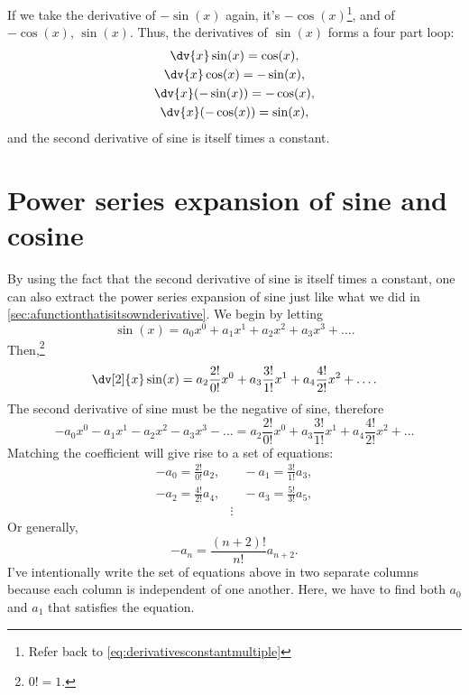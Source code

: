 If we take the derivative of $-\sin(x)$ again, it's $-\cos(x)$\footnote{Refer back to \cref{eq:derivativesconstantmultiple}}, and of $-\cos(x)$, $\sin(x)$. Thus, the derivatives of $\sin(x)$ forms a four part loop:
\begin{gather*}
    \dv{x}\sin(x) = \cos(x), \\
    \dv{x}\cos(x) = -\sin(x), \\
    \dv{x}(-\sin(x)) = -\cos(x), \\
    \dv{x}(-\cos(x)) = \sin(x),
\end{gather*}
and the second derivative of sine is itself times a constant.

\section{Power series expansion of sine and cosine}
\label{sec:taylorseriesforsineandcosine}

By using the fact that the second derivative of sine is itself times a constant, one can also extract the power series expansion of sine just like what we did in \cref{sec:afunctionthatisitsownderivative}. We begin by letting
\begin{equation}
    \sin(x) = a_0x^0 + a_1x^1 + a_2x^2 + a_3x^3 + \dots. \label{eq:taylorseriessineproof1}
\end{equation}
Then,\footnote{$0! = 1$.}
\begin{equation}
    \dv[2]{x}\sin(x) = a_2\frac{2!}{0!}x^0 + a_3\frac{3!}{1!}x^1 + a_4\frac{4!}{2!}x^2 + \dots. \label{eq:taylorseriessineproof2}
\end{equation}
The second derivative of sine must be the negative of sine, therefore
\begin{equation*}
    -a_0x^0 - a_1x^1 - a_2x^2 - a_3x^3 - \dots = a_2\frac{2!}{0!}x^0 + a_3\frac{3!}{1!}x^1 + a_4\frac{4!}{2!}x^2 + \dots
\end{equation*}
Matching the coefficient will give rise to a set of equations:
\begin{align*}
    -a_0 = \frac{2!}{0!}a_2, &\quad -a_1 = \frac{3!}{1!}a_3, \\
    -a_2 = \frac{4!}{2!}a_4, &\quad -a_3 = \frac{5!}{3!}a_5, \\
    &\vdots
\end{align*}
Or generally,
\begin{equation*}
    -a_n = \frac{(n + 2)!}{n!}a_{n + 2}.
\end{equation*}
I've intentionally write the set of equations above in two separate columns because each column is independent of one another. Here, we have to find both $a_0$ and $a_1$ that satisfies the equation.

